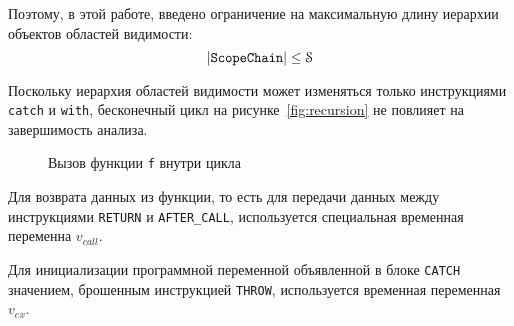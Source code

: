 Поэтому, в этой работе, введено ограничение на максимальную длину
иерархии объектов областей видимости:
\[
|\mathtt{ScopeChain}| \le \EuScript{S}
\]

Поскольку иерархия областей видимости может изменяться только
инструкциями \texttt{catch} и \texttt{with}, бесконечный цикл на
рисунке~\ref{fig:recursion} не повлияет на завершимость анализа.
\begin{figure}[htp]
\centering
{}
\caption{Вызов функции \texttt{f} внутри цикла}
\label{fig:while}
\end{figure}%

Для возврата данных из функции, то есть для передачи данных между
инструкциями \texttt{RETURN} и \texttt{AFTER\_CALL}, используется
специальная временная переменна $v_{call}$.

Для инициализации программной переменной объявленной в блоке
\texttt{CATCH} значением, брошенным инструкцией \texttt{THROW},
используется временная переменная $v_{ex}$.
